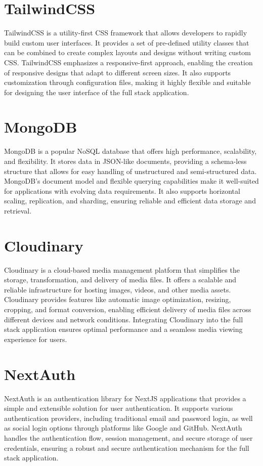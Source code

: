 \section{TailwindCSS}
TailwindCSS is a utility-first CSS framework that allows developers to rapidly build custom user interfaces. It provides a set of pre-defined utility classes that can be combined to create complex layouts and designs without writing custom CSS. TailwindCSS emphasizes a responsive-first approach, enabling the creation of responsive designs that adapt to different screen sizes. It also supports customization through configuration files, making it highly flexible and suitable for designing the user interface of the full stack application.

\section{MongoDB}
MongoDB is a popular NoSQL database that offers high performance, scalability, and flexibility. It stores data in JSON-like documents, providing a schema-less structure that allows for easy handling of unstructured and semi-structured data. MongoDB's document model and flexible querying capabilities make it well-suited for applications with evolving data requirements. It also supports horizontal scaling, replication, and sharding, ensuring reliable and efficient data storage and retrieval.

\section{Cloudinary}
Cloudinary is a cloud-based media management platform that simplifies the storage, transformation, and delivery of media files. It offers a scalable and reliable infrastructure for hosting images, videos, and other media assets. Cloudinary provides features like automatic image optimization, resizing, cropping, and format conversion, enabling efficient delivery of media files across different devices and network conditions. Integrating Cloudinary into the full stack application ensures optimal performance and a seamless media viewing experience for users.

\section{NextAuth}
NextAuth is an authentication library for NextJS applications that provides a simple and extensible solution for user authentication. It supports various authentication providers, including traditional email and password login, as well as social login options through platforms like Google and GitHub. NextAuth handles the authentication flow, session management, and secure storage of user credentials, ensuring a robust and secure authentication mechanism for the full stack application.

